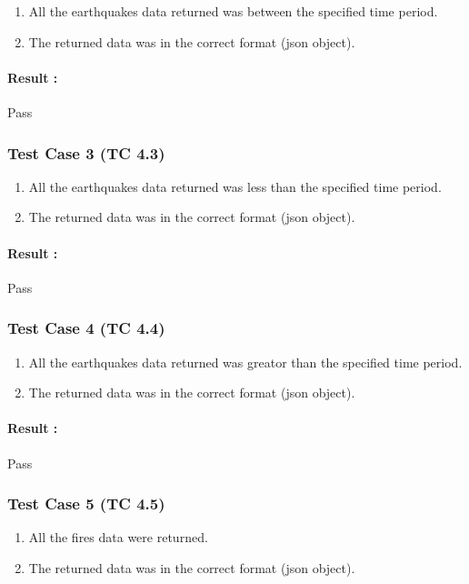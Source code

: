 \begin{enumerate}
	\item All the earthquakes data returned was between the specified time period.
	\item The returned data was in the correct format (json object).
\end{enumerate}

\paragraph{Result :} Pass

\subsubsection{Test Case 3 (TC 4.3)}

\begin{enumerate}
	\item All the earthquakes data returned was less than the specified time period.
	\item The returned data was in the correct format (json object).
\end{enumerate}

\paragraph{Result :} Pass

\subsubsection{Test Case 4 (TC 4.4)}

\begin{enumerate}
	\item All the earthquakes data returned was greator than the specified time period.
	\item The returned data was in the correct format (json object).
\end{enumerate}

\paragraph{Result :} Pass


\subsubsection{Test Case 5 (TC 4.5)}

\begin{enumerate}
	\item All the fires data were returned.
	\item The returned data was in the correct format (json object).
\end{enumerate}

